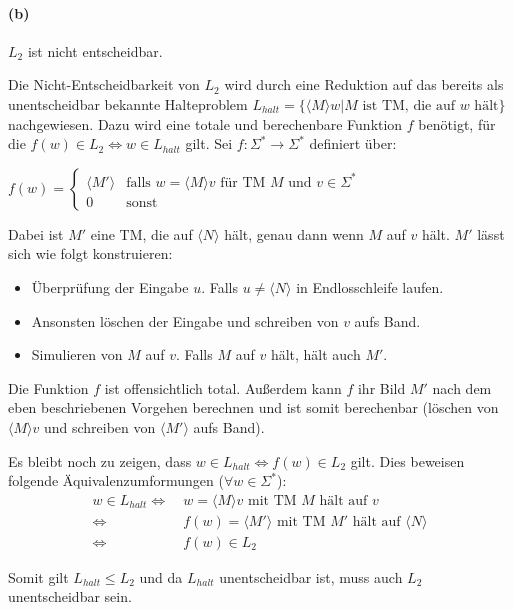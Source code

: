 \paragraph{(b)}
	$L_{2}$ ist nicht entscheidbar.

	Die Nicht-Entscheidbarkeit von $L_2$ wird durch eine Reduktion auf das bereits als unentscheidbar bekannte Halteproblem $L_{halt}=\{\langle M \rangle w | M \text{ ist TM, die auf } w \text{ hält} \}$ nachgewiesen. Dazu wird eine totale und berechenbare Funktion $f$ benötigt, für die $f(w) \in L_2 \Leftrightarrow w \in L_{halt}$ gilt. Sei $f:\Sigma^*\rightarrow \Sigma^*$ definiert über:

	$f(w)=\begin{cases}
		\langle M' \rangle &\text{falls $w=\langle M \rangle v$ für TM $M$ und $v \in \Sigma^*$}\\
		0 &\text{sonst}
	\end{cases}$

	Dabei ist $M'$ eine TM, die auf $\langle N \rangle$ hält, genau dann wenn $M$ auf $v$ hält. $M'$ lässt sich wie folgt konstruieren:
	\begin{itemize}
		\item Überprüfung der Eingabe $u$. Falls $u \neq \langle N \rangle$ in Endlosschleife laufen.
		\item Ansonsten löschen der Eingabe und schreiben von $v$ aufs Band.
		\item Simulieren von $M$ auf $v$. Falls $M$ auf $v$ hält, hält auch $M'$.
	\end{itemize}
	
	Die Funktion $f$ ist offensichtlich total. Außerdem kann $f$ ihr Bild $M'$ nach dem eben beschriebenen Vorgehen berechnen und ist somit berechenbar (löschen von $\langle M \rangle v$ und schreiben von $\langle M' \rangle$ aufs Band).

	Es bleibt noch zu zeigen, dass $w \in L_{halt} \Leftrightarrow f(w) \in L_2$ gilt. Dies beweisen folgende Äquivalenzumformungen ($\forall w \in \Sigma^*$):
	\begin{align*}
		w \in L_{halt} \Longleftrightarrow\ &w = \langle M \rangle v \text{ mit TM } M \text{ hält auf } v \\
		\Leftrightarrow\ &f(w) = \langle M' \rangle \text{ mit TM } M' \text{ hält auf } \langle N \rangle \\
		\Leftrightarrow\ &f(w) \in L_2
	\end{align*}

	Somit gilt $L_{halt} \leq L_2$ und da $L_{halt}$ unentscheidbar ist, muss auch $L_2$ unentscheidbar sein.
	
